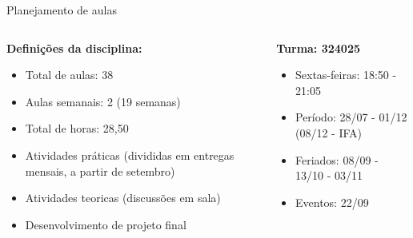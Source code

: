 \documentclass{beamer}
\begin{document}
\begin{frame}[fragile]{Planejamento de aulas}
      \begin{columns}
            \begin{column}{0.5\textwidth}
                  \textbf{Definições da disciplina:}
                  \begin{itemize}
                        \item Total de aulas: 38 
                        \item Aulas semanais: 2 (19 semanas)
                        \item Total de horas: 28,50
                        \item Atividades práticas (divididas em entregas mensais, a partir de setembro)
                        \item Atividades teoricas (discussões em sala)
                        \item Desenvolvimento de projeto final
      
                  \end{itemize}


            \end{column}
            \begin{column}{0.5\textwidth}
                  \textbf{Turma: 324025}
                  \begin{itemize}
                        \item Sextas-feiras: 18:50 - 21:05
                        \item Período: 28/07 - 01/12 (08/12 - IFA)
                        \item Feriados: 08/09 - 13/10 - 03/11
                        \item Eventos: 22/09
                  \end{itemize}
                  
            \end{column}
      \end{columns}
\end{frame}




%
%
%            
%        
\end{document}
